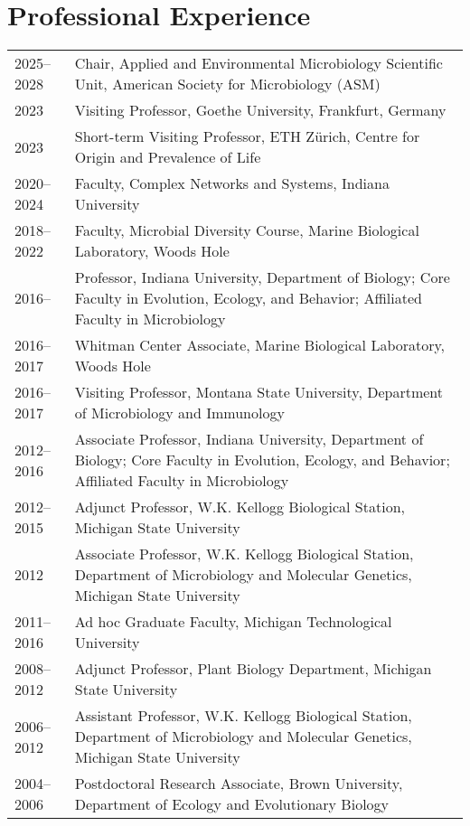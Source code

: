 \documentclass[11pt]{article}
\begin{document}
\section*{Professional Experience}
\vspace{-1.25em} %
\noindent
\begin{tabularx}{\textwidth}{@{}l@{\hspace{2em}}X@{}}
2025--2028  & Chair, Applied and Environmental Microbiology Scientific Unit, American Society for Microbiology (ASM) \\
2023         & Visiting Professor, Goethe University, Frankfurt, Germany \\
2023         & Short-term Visiting Professor, ETH Zürich, Centre for Origin and Prevalence of Life \\
2020--2024   & Faculty, Complex Networks and Systems, Indiana University \\
2018--2022   & Faculty, Microbial Diversity Course, Marine Biological Laboratory, Woods Hole \\
2016--       & Professor, Indiana University, Department of Biology; Core Faculty in Evolution, Ecology, and Behavior; Affiliated Faculty in Microbiology \\
2016--2017   & Whitman Center Associate, Marine Biological Laboratory, Woods Hole \\
2016--2017   & Visiting Professor, Montana State University, Department of Microbiology and Immunology \\
2012--2016   & Associate Professor, Indiana University, Department of Biology; Core Faculty in Evolution, Ecology, and Behavior; Affiliated Faculty in Microbiology \\
2012--2015   & Adjunct Professor, W.K. Kellogg Biological Station, Michigan State University \\
2012         & Associate Professor, W.K. Kellogg Biological Station, Department of Microbiology and Molecular Genetics, Michigan State University \\
2011--2016   & Ad hoc Graduate Faculty, Michigan Technological University \\
2008--2012   & Adjunct Professor, Plant Biology Department, Michigan State University \\
2006--2012   & Assistant Professor, W.K. Kellogg Biological Station, Department of Microbiology and Molecular Genetics, Michigan State University \\
2004--2006   & Postdoctoral Research Associate, Brown University, Department of Ecology and Evolutionary Biology \\
\end{tabularx}
\end{document}
